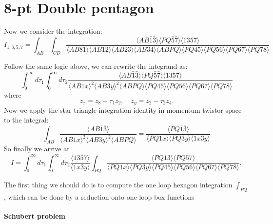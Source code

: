 \documentclass[10pt]{article}
\def\<{\langle}
\def\>{\rangle}
\begin{document}
\section{8-pt Double pentagon}
Now we consider the integration:
\begin{equation}
I_{1,3,5,7}=\int_{AB}\int_{CD}\frac{\<AB\bar1\bar3\>\<PQ\bar5\bar7\>\<1357\>}{\<AB81\>\<AB12\>\<AB23\>\<AB34\>\<ABPQ\>\<PQ45\>\<PQ56\>\<PQ67\>\<PQ78\>}
\end{equation}

Follow the same logic above, we can rewrite the integrand as:
\begin{equation}
\int_0^{\infty}d\tau_1\int_0^{\infty}d\tau_2\frac{\<AB\bar1\bar3\>\<PQ\bar5\bar7\>\<1357\>}{\<AB1x\>^2\<AB3y\>^2\<ABPQ\>\<PQ45\>\<PQ56\>\<PQ67\>\<PQ78\>}
\end{equation}
where 
\[
    z_x=z_8-\tau_1 z_2,\quad z_y=z_2-\tau_2 z_4.
\]
Now we apply the star-triangle integration identity in momentum twistor space to the integral:
\begin{equation}
\int_{AB}\frac{\<AB\bar{1}\bar{3}\>}{\<AB1x\>^2\<AB3y\>^2\<ABPQ\>}=\frac{\<PQ\bar{1}\bar{3}\>}{\<PQ1x\>\<PQ3y\>\<1x3y\>}
\end{equation}
So finally we arrive at
\[
    I=\int_0^{\infty}d\tau_1\int_0^{\infty}d\tau_2\frac{\<1357\>}{\<1x3y\>}\int_{PQ}\frac{\< PQ\bar1\bar3\> \<PQ\bar5\bar7\>}{\<PQ1x\>\<PQ3y\>\<PQ45\>\<PQ56\>\<PQ67\>\<PQ78\>},
\]

The first thing we should do is to compute the one loop hexagon integration $\int_{PQ}$, which can be done by a reduction onto one loop box functions
\paragraph{Schubert problem}
\end{document}
